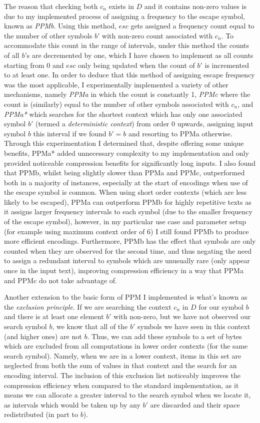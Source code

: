 \documentclass[a4paper, 11pt]{article}
\begin{document}
The reason that checking both $c_{n}$ exists in $D$ and it contains non-zero values is due to my implemented process of assigning a frequency to the escape symbol, known as \emph{PPMb}. Using this method, $esc$ gets assigned a frequency count equal to the number of other symbols $b'$ with non-zero count associated with $c_{n}$. To accommodate this count in the range of intervals, under this method the counts of all $b'$s are decremented by one, which I have chosen to implement as all counts starting from 0 and $esc$ only being updated when the count of $b'$ is incremented to at least one. In order to deduce that this method of assigning escape frequency was the most applicable, I experimentally implemented a variety of other mechanisms, namely \emph{PPMa} in which the count is constantly 1, \emph{PPMc} where the count is (similarly) equal to the number of other symbols associated with $c_{n}$, and \emph{PPMa*} which searches for the shortest context which has only one associated symbol $b'$ (termed a \emph{deterministic context}) from order 0 upwards, assigning input symbol $b$ this interval if we found $b' = b$ and resorting to PPMa otherwise. Through this experimentation I determined that, despite offering some unique benefits, PPMa* added unnecessary complexity to my implementation and only provided noticeable compression benefits for significantly long inputs. I also found that PPMb, whilst being slightly slower than PPMa and PPMc, outperformed both in a majority of instances, especially at the start of encodings when use of the escape symbol is common. When using short order contexts (which are less likely to be escaped), PPMa can outperform PPMb for highly repetitive texts as it assigns larger frequency intervals to each symbol (due to the smaller frequency of the escape symbol), however, in my particular use case and parameter setup (for example using maximum context order of 6) I still found PPMb to produce more efficient encodings.  Furthermore, PPMb has the effect that symbols are only counted when they are observed for the second time, and thus negating the need to assign a redundant interval to symbols which are unusually rare (only appear once in the input text), improving compression efficiency in a way that PPMa and PPMc do not take advantage of. 

Another extension to the basic form of PPM I implemented is what's known as the \emph{exclusion principle}. If we are searching the context $c_{n}$ in $D$ for our symbol $b$ and there is at least one element $b'$ with non-zero, but we have not observed our search symbol $b$, we know that all of the $b'$ symbols we have seen in this context (and higher ones) are not $b$. Thus, we can add these symbols to a set of bytes which are excluded from all computations in lower order contexts (for the same search symbol). Namely, when we are in a lower context, items in this set are neglected from both the sum of values in that context and the search for an encoding interval. The inclusion of this exclusion list noticeably improves the compression efficiency when compared to the standard implementation, as it means we can allocate a greater interval to the search symbol when we locate it, as intervals which would be taken up by any $b'$ are discarded and their space redistributed (in part to $b$).
\end{document}
